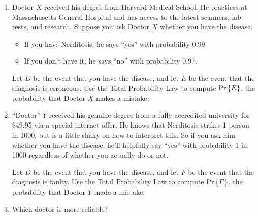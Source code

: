 \documentclass[12pt]{article}
\begin{document}
\begin{enumerate}
\item Doctor $X$ received his degree from Harvard Medical School.  He
practices at Massachusetts General Hospital and has access to the
latest scanners, lab tests, and research.  Suppose you ask Doctor $X$
whether you have the disease.
%
\begin{itemize}
\item If you have Nerditosis, he says ``yes'' with probability 0.99.
\item If you don't have it, he says ``no'' with probability 0.97.
\end{itemize}
%
Let $D$ be the event that you have the disease, and let $E$ be the
event that the diagnosis is erroneous.  Use the Total Probability Law
to compute $\mathop{\textup{Pr}}\nolimits\left\{E\right\}$, the probability that Doctor $X$ makes a mistake.


\item ``Doctor'' $Y$ received his genuine degree from a
fully-accredited university for \$49.95 via a special internet offer.
He knows that Nerditosis strikes 1 person in 1000, but is a little
shaky on how to interpret this.  So if you ask him whether you have
the disease, he'll helpfully say ``yes'' with probability 1 in 1000
regardless of whether you actually do or not.

Let $D$ be the event that you have the disease, and let $F$ be the
event that the diagnosis is faulty.  Use the Total Probability Law to
compute $\mathop{\textup{Pr}}\nolimits\left\{F\right\}$, the probability that Doctor $Y$ made a mistake.


\item Which doctor is more reliable?


\end{enumerate}
\end{document}
